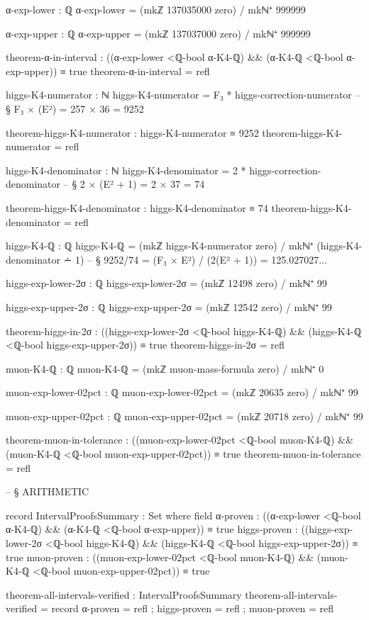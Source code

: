\documentclass[11pt,a4paper]{book}
\begin{document}
\begin{code}
α-exp-lower : ℚ
α-exp-lower = (mkℤ 137035000 zero) / mkℕ⁺ 999999

α-exp-upper : ℚ
α-exp-upper = (mkℤ 137037000 zero) / mkℕ⁺ 999999

theorem-α-in-interval : ((α-exp-lower <ℚ-bool α-K4-ℚ) && (α-K4-ℚ <ℚ-bool α-exp-upper)) ≡ true
theorem-α-in-interval = refl

higgs-K4-numerator : ℕ
higgs-K4-numerator = F₃ * higgs-correction-numerator
  -- § F₃ × (E²) = 257 × 36 = 9252

theorem-higgs-K4-numerator : higgs-K4-numerator ≡ 9252
theorem-higgs-K4-numerator = refl

higgs-K4-denominator : ℕ
higgs-K4-denominator = 2 * higgs-correction-denominator
  -- § 2 × (E² + 1) = 2 × 37 = 74

theorem-higgs-K4-denominator : higgs-K4-denominator ≡ 74
theorem-higgs-K4-denominator = refl

higgs-K4-ℚ : ℚ
higgs-K4-ℚ = (mkℤ higgs-K4-numerator zero) / mkℕ⁺ (higgs-K4-denominator ∸ 1)
  -- § 9252/74 = (F₃ × E²) / (2(E² + 1)) = 125.027027...

higgs-exp-lower-2σ : ℚ
higgs-exp-lower-2σ = (mkℤ 12498 zero) / mkℕ⁺ 99

higgs-exp-upper-2σ : ℚ
higgs-exp-upper-2σ = (mkℤ 12542 zero) / mkℕ⁺ 99

theorem-higgs-in-2σ : ((higgs-exp-lower-2σ <ℚ-bool higgs-K4-ℚ) && (higgs-K4-ℚ <ℚ-bool higgs-exp-upper-2σ)) ≡ true
theorem-higgs-in-2σ = refl

muon-K4-ℚ : ℚ
muon-K4-ℚ = (mkℤ muon-mass-formula zero) / mkℕ⁺ 0

muon-exp-lower-02pct : ℚ
muon-exp-lower-02pct = (mkℤ 20635 zero) / mkℕ⁺ 99

muon-exp-upper-02pct : ℚ
muon-exp-upper-02pct = (mkℤ 20718 zero) / mkℕ⁺ 99

theorem-muon-in-tolerance : ((muon-exp-lower-02pct <ℚ-bool muon-K4-ℚ) && (muon-K4-ℚ <ℚ-bool muon-exp-upper-02pct)) ≡ true
theorem-muon-in-tolerance = refl


-- § ARITHMETIC

record IntervalProofsSummary : Set where
  field
    α-proven : ((α-exp-lower <ℚ-bool α-K4-ℚ) && (α-K4-ℚ <ℚ-bool α-exp-upper)) ≡ true
    higgs-proven : ((higgs-exp-lower-2σ <ℚ-bool higgs-K4-ℚ) && (higgs-K4-ℚ <ℚ-bool higgs-exp-upper-2σ)) ≡ true
    muon-proven : ((muon-exp-lower-02pct <ℚ-bool muon-K4-ℚ) && (muon-K4-ℚ <ℚ-bool muon-exp-upper-02pct)) ≡ true

theorem-all-intervals-verified : IntervalProofsSummary
theorem-all-intervals-verified = record
  { α-proven = refl
  ; higgs-proven = refl
  ; muon-proven = refl
  }

\end{code}
\end{document}
